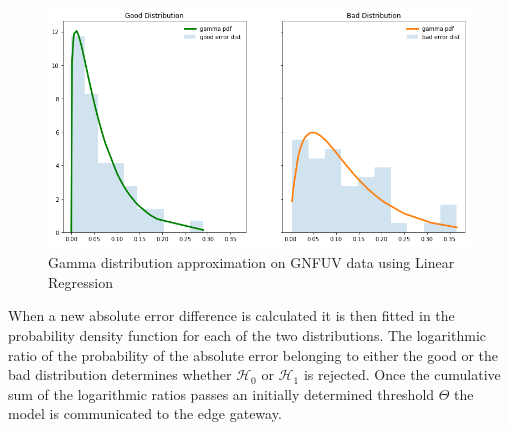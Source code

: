 \documentclass{mpaper}
\begin{document}
\begin{figure}[h]
    \centering
    \includegraphics[scale=0.3]{imgs/goodVSbad.png}
    \caption{Gamma distribution approximation on GNFUV data using Linear Regression}
    \label{fig:goodvsbad}
\end{figure}

When a new absolute error difference is calculated it is then fitted in the probability density function for each of the two distributions. The logarithmic ratio of the probability of the absolute error belonging to either the good or the bad distribution determines whether $\mathcal{H}_0$ or $\mathcal{H}_1$ is rejected. Once the cumulative sum of the logarithmic ratios passes an initially determined threshold $\Theta$ the model is communicated to the edge gateway.

\end{document}
